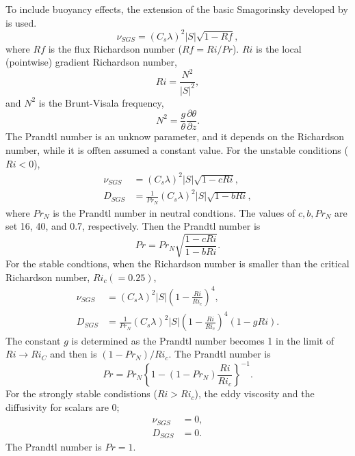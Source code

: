 To include buoyancy effects,
the extension of the basic Smagorinsky developed by \citet{Brown_etal_1994}
is used.
\begin{equation}
  \nu_{SGS} = (C_s\lambda)^2 |S| \sqrt{1-Rf},
\end{equation}
where $Rf$ is the flux Richardson number ($Rf = Ri/Pr$).
$Ri$ is the local (pointwise) gradient Richardson number,
\begin{equation}
  Ri = \frac{N^2}{|S|^2},
  \label{eq:Ri}
\end{equation}
and $N^2$ is the Brunt-Visala frequency,
\begin{equation}
  N^2 = \frac{g}{\theta}\frac{\partial\theta}{\partial z}.
  \label{eq:N^2}
\end{equation}
The Prandtl number is an unknow parameter,
and it depends on the Richardson number,
while it is offten assumed a constant value.
For the unstable conditions ($Ri < 0$),
\begin{align}
  \nu_{SGS} &= \left(C_s\lambda\right)^2 |S| \sqrt{1 - c Ri}, \label{eq:nu unstable} \\
  D_{SGS} &= \frac{1}{Pr_N} \left(C_s\lambda\right)^2 |S| \sqrt{1 - b Ri} \label{eq:nu^* unstable},
\end{align}
where $Pr_N$ is the Prandtl number in neutral condtions.
The values of $c, b, Pr_N$ are set 16, 40, and 0.7, respectively.
Then the Prandtl number is
\begin{equation}
  Pr = Pr_N \sqrt{\frac{1-c Ri}{1-b Ri}}.
\end{equation}
For the stable condtions,
when the Richardson number is smaller than the critical Richardson number, $Ri_c (=0.25)$,
\begin{align}
  \nu_{SGS} &= \left(C_s\lambda\right)^2 |S| \left(1-\frac{Ri}{Ri_c}\right)^4, \label{eq:nu stable} \\
  D_{SGS} &= \frac{1}{Pr_N}\left(C_s\lambda\right)^2 |S| \left(1-\frac{Ri}{Ri_c}\right)^4\left(1-g Ri\right). \label{eq:nu^* stable}
\end{align}
The constant $g$ is determined as the Prandtl number becomes 1
in the limit of $Ri \to Ri_C$ and then is $(1-Pr_N)/Ri_c$.
The Prandtl number is
\begin{equation}
  Pr = Pr_N \left\{1-(1-Pr_N)\frac{Ri}{Ri_c}\right\}^{-1}.
\end{equation}
For the strongly stable condistions ($Ri > Ri_c$),
the eddy viscosity and the diffusivity for scalars are 0;
\begin{align}
  \nu_{SGS} &= 0, \label{eq:nu strong stable} \\
  D_{SGS} &= 0. \label{eq:nu^* strong stable}
\end{align}
The Prandtl number is $Pr = 1$.


